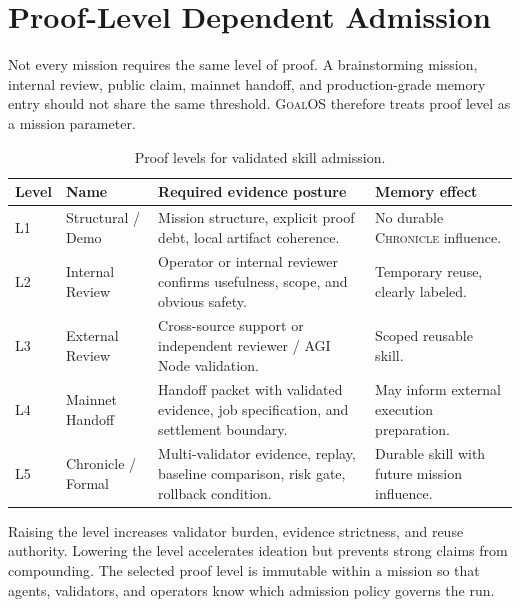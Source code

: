 \documentclass[10.5pt,oneside]{article}
\newcommand{\goalos}{\textsc{GoalOS}}
\newcommand{\chronicle}{\textsc{Chronicle}}
\begin{document}
\section{Proof-Level Dependent Admission}
Not every mission requires the same level of proof. A brainstorming mission, internal review, public claim, mainnet handoff, and production-grade memory entry should not share the same threshold. \goalos{} therefore treats proof level as a mission parameter.

\begin{table}[H]
\centering
\small
\caption{Proof levels for validated skill admission.}
\begin{tabularx}{\textwidth}{@{}p{}p{}X p{}@{}}
\toprule
\textbf{Level} & \textbf{Name} & \textbf{Required evidence posture} & \textbf{Memory effect} \\
\midrule
L1 & Structural / Demo & Mission structure, explicit proof debt, local artifact coherence. & No durable \chronicle{} influence. \\
L2 & Internal Review & Operator or internal reviewer confirms usefulness, scope, and obvious safety. & Temporary reuse, clearly labeled. \\
L3 & External Review & Cross-source support or independent reviewer / AGI Node validation. & Scoped reusable skill. \\
L4 & Mainnet Handoff & Handoff packet with validated evidence, job specification, and settlement boundary. & May inform external execution preparation. \\
L5 & Chronicle / Formal & Multi-validator evidence, replay, baseline comparison, risk gate, rollback condition. & Durable skill with future mission influence. \\
\bottomrule
\end{tabularx}
\label{tab:levels}
\end{table}

Raising the level increases validator burden, evidence strictness, and reuse authority. Lowering the level accelerates ideation but prevents strong claims from compounding. The selected proof level is immutable within a mission so that agents, validators, and operators know which admission policy governs the run.
\end{document}
